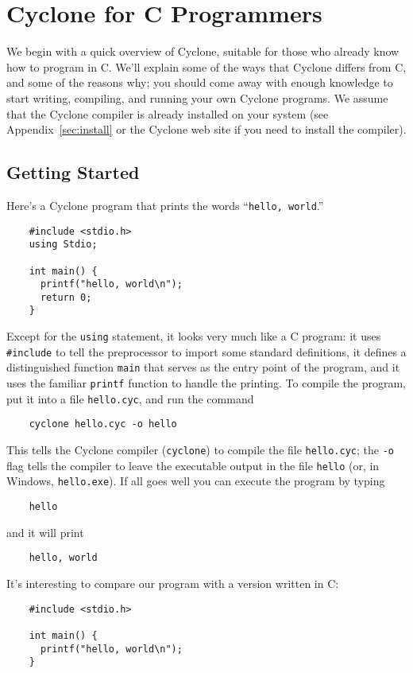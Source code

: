 \section{Cyclone for C Programmers}

We begin with a quick overview of Cyclone, suitable for those who
already know how to program in C\@.  We'll explain some of the ways
that Cyclone differs from C, and some of the reasons why; you should
come away with enough knowledge to start writing, compiling, and
running your own Cyclone programs.  We assume that the Cyclone
compiler is already installed on your system (see
Appendix~\ref{sec:install} or the Cyclone web site if you need to
install the compiler).

\subsection{Getting Started}

Here's a Cyclone program that prints the words ``\texttt{hello,
  world}.''
\begin{verbatim}
    #include <stdio.h>
    using Stdio;

    int main() {
      printf("hello, world\n");
      return 0;
    }
\end{verbatim}

Except for the \texttt{using} statement, it looks very much like a C
program: it uses \texttt{\#include} to tell the preprocessor to import
some standard definitions, it defines a distinguished function
\texttt{main} that serves as the entry point of the program, and it
uses the familiar \texttt{printf} function to handle the printing.  To
compile the program, put it into a file \texttt{hello.cyc}, and run
the command
\begin{verbatim}
    cyclone hello.cyc -o hello
\end{verbatim}
This tells the Cyclone compiler (\texttt{cyclone}) to compile the file
\texttt{hello.cyc}; the \texttt{-o} flag tells the compiler to leave
the executable output in the file \texttt{hello} (or, in Windows,
\texttt{hello.exe}).  If all goes well you can execute the program by
typing
\begin{verbatim}
    hello
\end{verbatim}
and it will print
\begin{verbatim}
    hello, world
\end{verbatim}

It's interesting to compare our program with a version written in C:
\begin{verbatim}
    #include <stdio.h>

    int main() {
      printf("hello, world\n");
    }
\end{verbatim}

